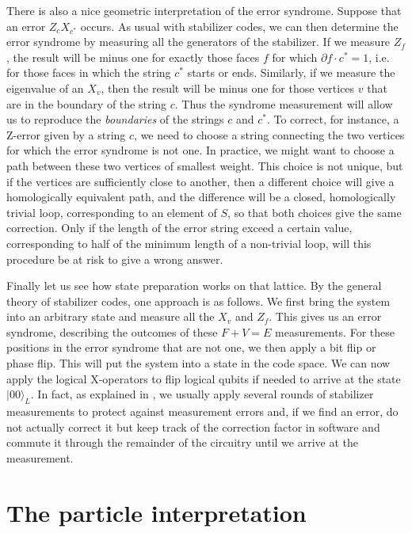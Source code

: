 \documentclass[a4paper, draft]{article}
\theoremstyle{own}
\theoremstyle{remark}
\begin{document}
There is also a nice geometric interpretation of the error syndrome. Suppose that an error $Z_c X_{c^*}$ occurs. As usual with stabilizer codes, we can then determine the error syndrome by measuring all the generators of the stabilizer. If we measure $Z_f$, the result will be minus one for exactly those faces $f$ for which $\partial f \cdot c^* = 1$, i.e. for those faces in which the string $c^*$ starts or ends. Similarly, if we measure the eigenvalue of an $X_v$, then the result will be minus one for those vertices $v$ that are in the boundary of the string $c$. Thus the syndrome measurement will allow us to reproduce the \emph{boundaries} of the strings $c$ and $c^*$. To correct, for instance, a Z-error given by a string $c$, we need to choose a string connecting the two vertices for which the error syndrome is not one. In practice, we might want to choose a path between these two vertices of smallest weight. This choice is not unique, but if the vertices are sufficiently close to another, then a different choice will give a homologically equivalent path, and the difference will be a closed, homologically trivial loop, corresponding to an element of $S$, so that both choices give the same correction. Only if the length of the error string exceed a certain value, corresponding to half of the minimum length of a non-trivial loop, will this procedure be at risk to give a wrong answer. 

Finally let us see how state preparation works on that lattice. By the general theory of stabilizer codes, one approach is as follows. We first bring the system into an arbitrary state and measure all the $X_v$ and $Z_f$. This gives us an error syndrome, describing the outcomes of these $F + V = E$ measurements. For these positions in the error syndrome that are not one, we then apply a bit flip or phase flip. This will put the system into a state in the code space. We can now apply the logical X-operators to flip logical qubits if needed to arrive at the state $|0 0\rangle_L$. In fact, as explained in \cite{SurfaceCodes}, we usually apply several rounds of stabilizer measurements to protect against measurement errors and, if we find an error, do not actually correct it but keep track of the correction factor in software and commute it through the remainder of the circuitry until we arrive at the measurement.


\section{The particle interpretation}
\end{document}
